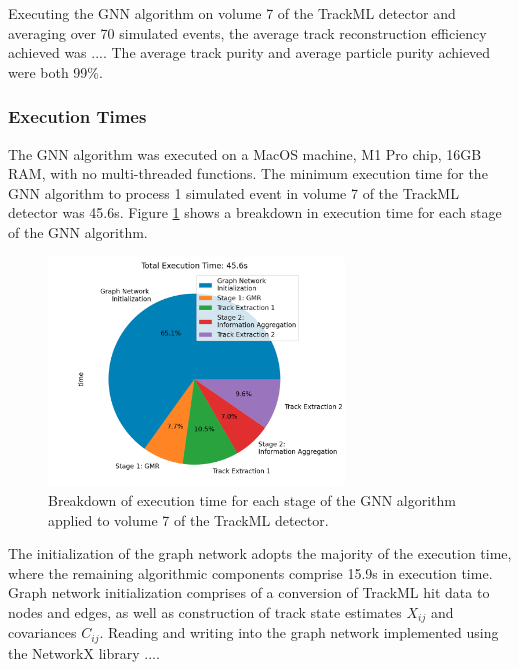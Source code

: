 Executing the GNN algorithm on volume 7 of the TrackML detector and averaging over 70 simulated events, the average track reconstruction efficiency achieved was .... The average track purity and average particle purity achieved were both 99\%.



\subsubsection{Execution Times}

The GNN algorithm was executed on a MacOS machine, M1 Pro chip, 16GB RAM, with no multi-threaded functions. The minimum execution time for the GNN algorithm to process 1 simulated event in volume 7 of the TrackML detector was 45.6s. Figure \ref{fig:execution-time-endcap-1} shows a breakdown in execution time for each stage of the GNN algorithm.

\begin{figure}[htbp]
    \centering
    \includegraphics[width=0.7\textwidth]{images/7-results/execution-time-endcap-1.png}
    \caption{Breakdown of execution time for each stage of the GNN algorithm applied to volume 7 of the TrackML detector.}
    \label{fig:execution-time-endcap-1}%
\end{figure}


The initialization of the graph network adopts the majority of the execution time, where the remaining algorithmic components comprise 15.9s in execution time. Graph network initialization comprises of a conversion of TrackML hit data to nodes and edges, as well as construction of track state estimates $X_{ij}$ and covariances $C_{ij}$. Reading and writing into the graph network implemented using the NetworkX library ....



